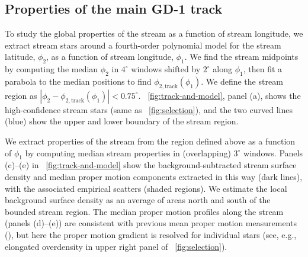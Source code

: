 \documentclass[modern]{aastex62}
\begin{document}
\subsection{Properties of the main GD-1 track}
\label{sec:res_global}

To study the global properties of the stream as a function of stream longitude,
we extract stream stars around a fourth-order polynomial model for the stream
latitude, $\phi_2$, as a function of stream longitude, $\phi_1$.
We find the stream midpoints by computing the median $\phi_2$ in $4^\circ$
windows shifted by $2^\circ$ along $\phi_1$, then fit a parabola to the median
positions to find $\phi_{2, \textrm{track}}(\phi_1)$.
We define the stream region as $\left| \phi_2 - \phi_{2,
\textrm{track}}(\phi_1) \right| < 0.75^\circ$.
\figurename~\ref{fig:track-and-model}, panel (a), shows the high-confidence
stream stars (same as \figurename~\ref{fig:selection}), and the two curved lines
(blue) show the upper and lower boundary of the stream region.

We extract properties of the stream from the region defined above as a function of $\phi_1$ by computing median stream properties in (overlapping) $3^\circ$ windows.
Panels (c)--(e) in \figurename~\ref{fig:track-and-model} show the
background-subtracted stream surface density and median proper motion components
extracted in this way (dark lines), with the associated empirical scatters
(shaded regions).
We estimate the local background surface density as an average of areas north
and south of the bounded stream region.
The median proper motion profiles along the stream (panels (d)--(e)) are
consistent with previous mean proper motion measurements
(\citealt{Koposov:2010}), but here the proper motion gradient is resolved for
individual stars (see, e.g., elongated overdensity in upper right panel of
\figurename~\ref{fig:selection}).
\end{document}
